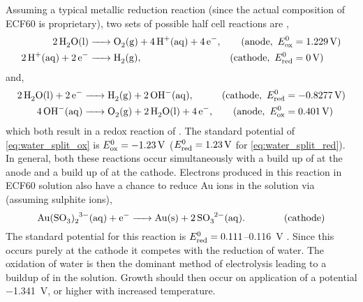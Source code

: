 \documentclass{article}
\begin{document}
Assuming a typical metallic reduction reaction (since the actual composition of ECF60 is proprietary), two sets of possible half cell reactions are \cite{haynes2013crc},
\begin{subequations}
\begin{align}
\cee{2H2O(l) &-> O2(g) + 4H+(aq) + 4e-}, &(\mathrm{anode},\ \Eox&=\SI{1.229}{V}) \label{eq:water_split_ox} \\
\cee{2H+(aq) + 2e- &-> H2(g)}, &(\mathrm{cathode},\ \Ered&=\SI{0}{V})
\end{align}
\end{subequations}
and,
\begin{subequations}
\begin{align}
\cee{2H2O(l) + 2e- &-> H2(g) + 2OH^-(aq)}, &(\mathrm{cathode},\ \Ered&=\SI{-0.8277}{V}) \label{eq:water_split_red} \\
\cee{4OH^-(aq) &-> O2(g) + 2H2O(l) + 4e-}, &(\mathrm{anode},\ \Eox&=\SI{0.401}{V})
\end{align}
\end{subequations}
which both result in a redox reaction of . The standard potential of \eqref{eq:water_split_ox} is $E^0_{\mathrm{ox}}=\SI{-1.23}{V}$ ($E^0_{\mathrm{red}}=\SI{1.23}{V}$ for \eqref{eq:water_split_red}). In general, both these reactions occur simultaneously with a build up of  at the anode and a build up of  at the cathode. Electrons produced in this reaction in ECF60 solution also have a chance to reduce Au ions in the solution via (assuming sulphite ions),
\begin{equation} \cee{Au(SO3)2^{3-}(aq) + e- -> Au(s) + 2SO3^{2-}(aq)}. \qquad\qquad (\mathrm{cathode}) \end{equation}
The standard potential for this reaction is $E^0_{\mathrm{red}}=0.111$--\SI{0.116}{V} \cite{green2007gold}.
Since this occurs purely at the cathode it competes with the reduction of water. The oxidation of water is then the dominant method of electrolysis leading to a buildup of  in the solution. Growth should then occur on application of a potential \SI{-1.341}{V}, or higher with increased temperature.%
\end{document}
